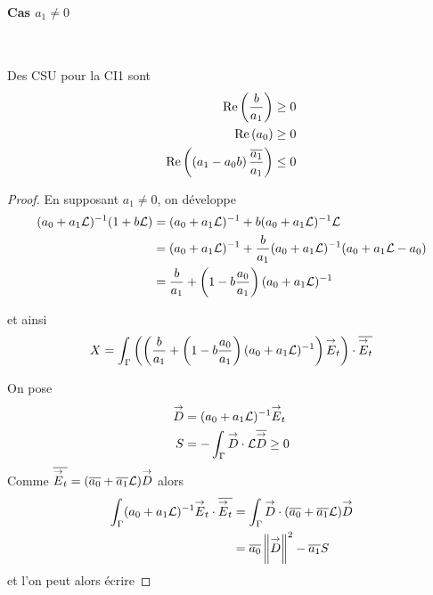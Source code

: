       \paragraph{Cas \(a_1\not=0\)}
        ~
        \begin{prop}
          Des CSU pour la CI1 sont
          \begin{align}
            \operatorname{Re}\left(\dfrac{b}{a_1}\right) \ge 0 \\
            \operatorname{Re}\left(a_0\right) \ge 0 \\
            \operatorname{Re}\left(\left(a_1-a_0 b\right)\dfrac{{\overline{a_1}}}{a_1}\right) \le 0
          \end{align}
        \end{prop}
        \begin{proof}
          En supposant \(a_1 \not=0\), on développe 
          \begin{align*}
            (a_0 + a_1 \mathcal{L})^{-1}(1 + b \mathcal{L}) &= (a_0 + a_1 \mathcal{L})^{-1} + b (a_0 + a_1 \mathcal{L})^{-1}\mathcal{L}
            \\
            &=(a_0 + a_1 \mathcal{L})^{-1} + \dfrac{b}{a_1} (a_0 + a_1 \mathcal{L})^{-1}(a_0 + a_1\mathcal{L} -a_0)
            \\
            &=\dfrac{b}{a_1} + \left(1-b\dfrac{a_0}{a_1}\right)(a_0+a_1 \mathcal{L})^{-1}
          \end{align*}

          et ainsi
          \[
            X = \int_\Gamma \left(\left(\dfrac{b}{a_1}  + \left(1-b\dfrac{a_0}{a_1}\right)(a_0+a_1 \mathcal{L})^{-1}\right){\overset{\rightarrow}{E}}_t\right) \cdot {\overline{{\overset{\rightarrow}{E}}_t}} 
          \]

          On pose
          \begin{align*}
            {\overset{\rightarrow}{D}} &= (a_0 + a_1 \mathcal{L})^{-1}{\overset{\rightarrow}{E}}_t
            \\
            S &= -\int_\Gamma {\overset{\rightarrow}{D}} \cdot \mathcal{L}{\overline{{\overset{\rightarrow}{D}}}} \ge 0
          \end{align*}
          Comme \({\overline{{\overset{\rightarrow}{E}}_t}} = ({\overline{a_0}} + {\overline{a_1}}\mathcal{L}){\overset{\rightarrow}{D}}\) alors 
          \begin{align*}
            \int_\Gamma (a_0 +a_1 \mathcal{L}) ^{-1}{\overset{\rightarrow}{E}}_t\cdot {\overline{{\overset{\rightarrow}{E}}_t}} 
            &= \int_\Gamma {\overset{\rightarrow}{D}}\cdot ({\overline{a_0}} + {\overline{a_1}}\mathcal{L}){\overset{\rightarrow}{D}} 
            \\
            &= {\overline{a_0}} \left\lVert{\overset{\rightarrow}{D}}\right\rVert^2 - {\overline{a_1}} S
          \end{align*}
          et l'on peut alors écrire


\end{proof}

